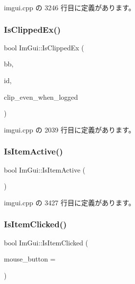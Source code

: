  imgui.\+cpp の 3246 行目に定義があります。

\mbox{\label{namespace_im_gui_a8674467ae34d04bc99df1f7f98f47407}} 
\subsubsection{\texorpdfstring{Is\+Clipped\+Ex()}{IsClippedEx()}}
{\footnotesize\ttfamily bool Im\+Gui\+::\+Is\+Clipped\+Ex (\begin{DoxyParamCaption}\item[{const \mbox{\hyperlink{struct_im_rect}{Im\+Rect}} \&}]{bb,  }\item[{\mbox{\hyperlink{imgui_8h_a1785c9b6f4e16406764a85f32582236f}{Im\+Gui\+ID}}}]{id,  }\item[{bool}]{clip\+\_\+even\+\_\+when\+\_\+logged }\end{DoxyParamCaption})}



 imgui.\+cpp の 2039 行目に定義があります。

\mbox{\label{namespace_im_gui_a2d8ac4569456a8003e4dddd39caf771c}} 
\subsubsection{\texorpdfstring{Is\+Item\+Active()}{IsItemActive()}}
{\footnotesize\ttfamily bool Im\+Gui\+::\+Is\+Item\+Active (\begin{DoxyParamCaption}{ }\end{DoxyParamCaption})}



 imgui.\+cpp の 3427 行目に定義があります。

\mbox{\label{namespace_im_gui_a0b5780dbd580e28f5d31f39da80b0b01}} 
\subsubsection{\texorpdfstring{Is\+Item\+Clicked()}{IsItemClicked()}}
{\footnotesize\ttfamily bool Im\+Gui\+::\+Is\+Item\+Clicked (\begin{DoxyParamCaption}\item[{int}]{mouse\+\_\+button = {} }\end{DoxyParamCaption})}



